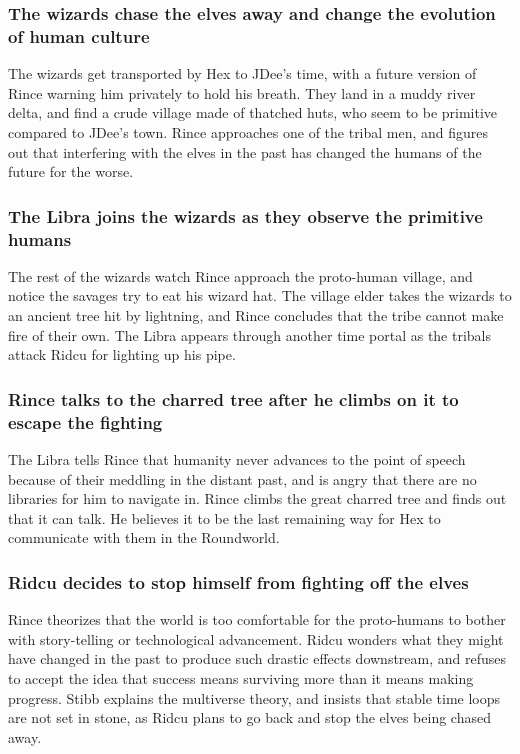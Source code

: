 \subsubsection{The wizards chase the elves away and change the evolution of human culture}
The wizards get transported by \Gls{Hex} to \Gls{JDee}'s time, with a future version of \Gls{Rince}
warning him privately to hold his breath. They land in a muddy river delta, and find a crude village
made of thatched huts, who seem to be primitive compared to \Gls{JDee}'s town. \Gls{Rince}
approaches one of the tribal men, and figures out that interfering with the elves in the past has
changed the humans of the future for the worse.

\subsubsection{The \Gls{Libra} joins the wizards as they observe the primitive humans}
The rest of the wizards watch \Gls{Rince} approach the proto-human village, and notice the savages
try to eat his wizard hat. The village elder takes the wizards to an ancient tree hit by lightning,
and \Gls{Rince} concludes that the tribe cannot make fire of their own. The \Gls{Libra} appears
through another time portal as the tribals attack \Gls{Ridcu} for lighting up his pipe.

\subsubsection{\Gls{Rince} talks to the charred tree after he climbs on it to escape the fighting}
The \Gls{Libra} tells \Gls{Rince} that humanity never advances to the point of speech because of
their meddling in the distant past, and is angry that there are no libraries for him to navigate in.
\Gls{Rince} climbs the great charred tree and finds out that it can talk. He believes it to be the
last remaining way for \Gls{Hex} to communicate with them in the Roundworld.

\subsubsection{\Gls{Ridcu} decides to stop himself from fighting off the elves}
\Gls{Rince} theorizes that the world is too comfortable for the proto-humans to bother with
story-telling or technological advancement. \Gls{Ridcu} wonders what they might have changed in the
past to produce such drastic effects downstream, and refuses to accept the idea that success means
surviving more than it means making progress. \Gls{Stibb} explains the multiverse theory, and
insists that stable time loops are not set in stone, as \Gls{Ridcu} plans to go back and stop the
elves being chased away.

